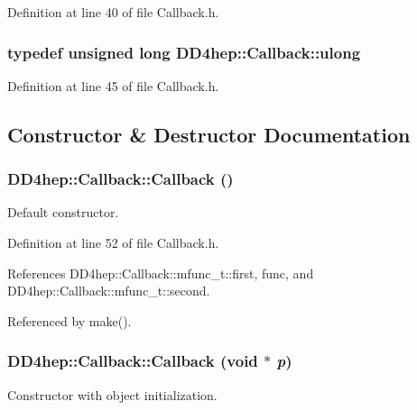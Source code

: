 Definition at line 40 of file Callback.h.\hypertarget{class_d_d4hep_1_1_callback_ac676aa0685e2ba51bac69c33f8066431}{
\subsubsection[{ulong}]{\setlength{\rightskip}{0pt plus 5cm}typedef unsigned long {\bf DD4hep::Callback::ulong}}}
\label{class_d_d4hep_1_1_callback_ac676aa0685e2ba51bac69c33f8066431}


Definition at line 45 of file Callback.h.

\subsection{Constructor \& Destructor Documentation}
\hypertarget{class_d_d4hep_1_1_callback_af29b371d4eb53f3e27df8c3250899950}{
\subsubsection[{Callback}]{\setlength{\rightskip}{0pt plus 5cm}DD4hep::Callback::Callback ()}}
\label{class_d_d4hep_1_1_callback_af29b371d4eb53f3e27df8c3250899950}


Default constructor. 

Definition at line 52 of file Callback.h.

References DD4hep::Callback::mfunc\_\-t::first, func, and DD4hep::Callback::mfunc\_\-t::second.

Referenced by make().\hypertarget{class_d_d4hep_1_1_callback_a11bd26d9c2634ea669f13d30d1462f8e}{
\subsubsection[{Callback}]{\setlength{\rightskip}{0pt plus 5cm}DD4hep::Callback::Callback (void $\ast$ {\em p})}}
\label{class_d_d4hep_1_1_callback_a11bd26d9c2634ea669f13d30d1462f8e}


Constructor with object initialization. 

